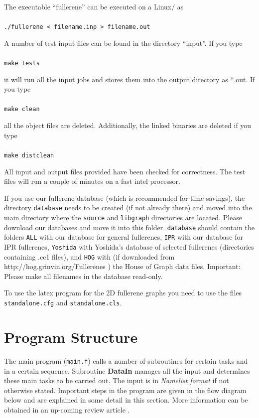 \documentclass[article,a4paper,twoside]{memoir}
\let\acr=\textsmaller
\newcommand{\filename}[1]{\texttt{#1}}
\newcommand{\funname}[1]{{\color{blue}\textbf{#1}}}
\begin{document}
The executable ``fullerene'' can be executed on a Linux/\acr{UNIX} as\\\\
\verb|./fullerene < filename.inp > filename.out|

A number of test input files can be found in the directory ``input''. If you type\\\\
\verb|make tests|

it will run all the input jobs and stores them into the output directory as *.out. If you type\\\\
\verb|make clean|

all the object files are deleted. Additionally, the linked binaries are deleted if you type\\\\
\verb|make distclean|

All input and output files provided have been checked for correctness. The test files will run a couple of minutes
on a fast intel processor.

If you use our fullerene database (which is recommended for time savings), the directory \filename{database} needs 
to be created (if not already there) and moved into the main directory where the \filename{source} and \filename{libgraph} 
directories are located. Please download our databases and move it into this folder. \filename{database} should contain
the folders \filename{ALL} with our database for general fullerenes, \filename{IPR} with our database 
for IPR fullerenes, \filename{Yoshida} with Yoshida's database of selected fullerenes (directories containing .cc1 files),
and \filename{HOG} with (if downloaded from http://hog.grinvin.org/Fullerenes ) the House of Graph data files. Important: Please make all filenames in the database read-only.

To use the latex program for the 2D fullerene graphs you need to use the files \filename{standalone.cfg} and \filename{standalone.cls}.


\section{Program Structure}
The main program (\filename{main.f}) calls a number of subroutines for certain tasks and in a certain sequence.
Subroutine \funname{DataIn} manages all the input and determines these main tasks to be carried out.
The input is in \textit{Namelist format} if not otherwise stated. 
Important steps in the program are given in the flow diagram below and are
explained in some detail in this section. More information can be obtained in an up-coming review article \cite{PSJA}.
\end{document}
